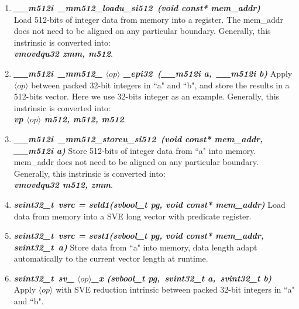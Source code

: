 \documentclass[5p,times,twocolumn]{elsarticle}
\begin{document}
\begin{enumerate}[]%
  \item \emph{\textbf{\textit{\_\_m512i\ \_mm512\_loadu\_si512\ (void const* mem\_addr)}}} \\
  Load 512-bits of integer data from memory into a register. The mem\_addr does not need to be aligned on any particular boundary.
  Generally, this instrinsic is converted into:\\
  \emph{\textbf{\textit{vmovdqu32  zmm,  m512}}}.
  \item \emph{\textbf{\textit{\_\_m512i\ \_mm512\_ $\langle op \rangle$ \_epi32\ (\_\_m512i a,\ \_\_m512i b)}}}
  Apply $\langle op \rangle$ between packed 32-bit integers in ``a" and ``b", and store the results in a 512-bits vector. Here we use 32-bits integer as an example.
  Generally, this instrinsic is converted into:\\
  \emph{\textbf{\textit{vp $\langle op \rangle$  m512,  m512,  m512}}}.
  \item \emph{\textbf{\textit{\_\_m512i\ \_mm512\_storeu\_si512\ (void const* mem\_addr,\\ \_\_m512i a)}}}
  Store 512-bits of integer data from ``a" into memory. mem\_addr does not need to be aligned on any particular boundary.
  Generally, this instrinsic is converted into:\\
  \emph{\textbf{\textit{vmovdqu32  m512, zmm}}}.
  \item \emph{\textbf{\textit{svint32\_t\ vsrc = svld1(svbool\_t pg, void const* mem\_addr)}}}
  Load data from memory into a SVE long vector with predicate register.
  \item \emph{\textbf{\textit{svint32\_t\ vsrc = svst1(svbool\_t pg, void const* mem\_addr, svint32\_t\ a)}}}
  Store data from ``a" into memory, data length adapt automatically to the current vector length at runtime.
  \item \emph{\textbf{\textit{svint32\_t\ sv_ $\langle op \rangle$\_x (svbool\_t pg,\ svint32\_t a,\ svint32\_t b)}}}
  Apply $\langle op \rangle$ with SVE reduction intrinsic between packed 32-bit integers in ``a" and ``b".
\end{enumerate}
\end{document}
